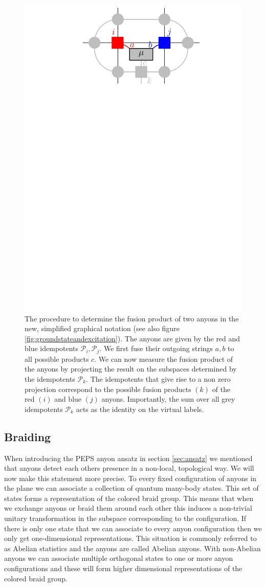 \documentclass[12 pt]{article}
\begin{document}
\begin{figure}[H]
  \centering
 \includegraphics[width=0.42\linewidth]{FusionIdempotents.pdf}
    \caption{The procedure to determine the fusion product of two anyons in the new, simplified graphical notation (see also figure \ref{fig:groundstateandexcitation}). The anyons are given by the red and blue idempotents $\mathcal{P}_i, \mathcal{P}_j$. We first fuse their outgoing strings $a,b$ to all possible products $c$. We can now measure the fusion product of the anyons by projecting the result on the subspaces determined by the idempotents $\mathcal{P}_k$. The idempotents that give rise to a non zero projection correspond to the possible fusion products $(k)$ of the red $(i)$ and blue $(j)$ anyons. Importantly, the sum over all grey idempotents $\mathcal{P}_k$ acts as the identity on the virtual labels.}
 \label{fig:fusionidempotents}
\end{figure}

\subsection{Braiding} \label{sec:braiding}

When introducing the PEPS anyon ansatz in section \ref{sec:ansatz} we mentioned that anyons detect each others presence in a non-local, topological way. We will now make this statement more precise. To every fixed configuration of anyons in the plane we can associate a collection of quantum many-body states. This set of states forms a representation of the colored braid group. This means that when we exchange anyons or braid them around each other this induces a non-trivial unitary transformation in the subspace corresponding to the configuration.  If there is only one state that we can associate to every anyon configuration then we only get one-dimensional representations. This situation is commonly referred to as Abelian statistics and the anyons are called Abelian anyons. With non-Abelian anyons we can associate multiple orthogonal states to one or more anyon configurations and these will form higher dimensional representations of the colored braid group. 
\end{document}
